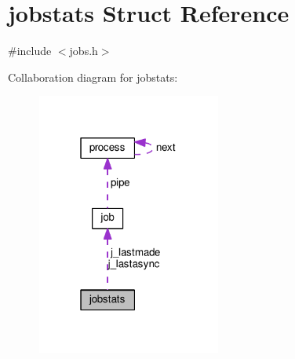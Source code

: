 \hypertarget{structjobstats}{}\section{jobstats Struct Reference}
\label{structjobstats}


{\ttfamily \#include $<$jobs.\+h$>$}



Collaboration diagram for jobstats\+:
\nopagebreak
\begin{figure}[H]
\begin{center}
\leavevmode
\includegraphics[width=171pt]{structjobstats__coll__graph}
\end{center}
\end{figure}
